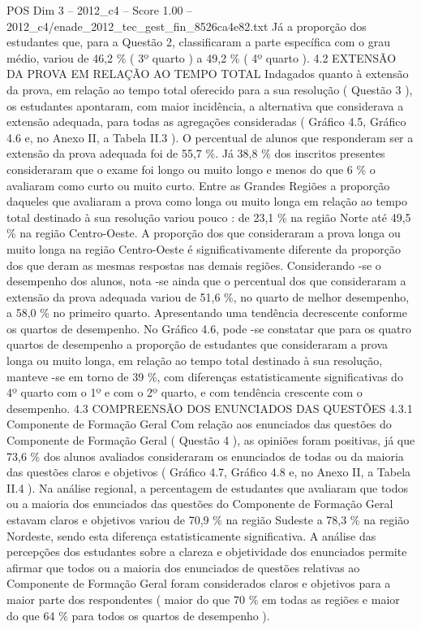 \begin{textsample}{POS Dim 3 – 2012\_c4 – Score 1.00 – 2012\_c4/enade\_2012\_tec\_gest\_fin\_8526ca4e82.txt}
Já a proporção dos estudantes que, para a Questão 2, classificaram a parte específica com o grau médio, variou de 46,2 \% ( 3º quarto ) a 49,2 \% ( 4º quarto ). 4.2 EXTENSÃO DA PROVA EM RELAÇÃO AO TEMPO TOTAL Indagados quanto à extensão da prova, em relação ao tempo total oferecido para a sua resolução ( Questão 3 ), os estudantes apontaram, com maior incidência, a alternativa que considerava a extensão adequada, para todas as agregações consideradas ( Gráfico 4.5, Gráfico 4.6 e, no Anexo II, a Tabela II.3 ).
O percentual de alunos que responderam ser a extensão da prova adequada foi de 55,7 \%.
Já 38,8 \% dos inscritos presentes consideraram que o exame foi longo ou muito longo e menos do que 6 \% o avaliaram como curto ou muito curto.
Entre as Grandes Regiões a proporção daqueles que avaliaram a prova como longa ou muito longa em relação ao tempo total destinado à sua resolução variou pouco : de 23,1 \% na região Norte até 49,5 \% na região Centro-Oeste.
A proporção dos que consideraram a prova longa ou muito longa na região Centro-Oeste é significativamente diferente da proporção dos que deram as mesmas respostas nas demais regiões.
Considerando -se o desempenho dos alunos, nota -se ainda que o percentual dos que consideraram a extensão da prova adequada variou de 51,6 \%, no quarto de melhor desempenho, a 58,0 \% no primeiro quarto.
Apresentando uma tendência decrescente conforme os quartos de desempenho.
No Gráfico 4.6, pode -se constatar que para os quatro quartos de desempenho a proporção de estudantes que consideraram a prova longa ou muito longa, em relação ao tempo total destinado à sua resolução, manteve -se em torno de 39 \%, com diferenças estatisticamente significativas do 4º quarto com o 1º e com o 2º quarto, e com tendência crescente com o desempenho. 4.3 COMPREENSÃO DOS ENUNCIADOS DAS QUESTÕES 4.3.1 Componente de Formação Geral Com relação aos enunciados das questões do Componente de Formação Geral ( Questão 4 ), as opiniões foram positivas, já que 73,6 \% dos alunos avaliados consideraram os enunciados de todas ou da maioria das questões claros e objetivos ( Gráfico 4.7, Gráfico 4.8 e, no Anexo II, a Tabela II.4 ).
Na análise regional, a percentagem de estudantes que avaliaram que todos ou a maioria dos enunciados das questões do Componente de Formação Geral estavam claros e objetivos variou de 70,9 \% na região Sudeste a 78,3 \% na região Nordeste, sendo esta diferença estatisticamente significativa.
A análise das percepções dos estudantes sobre a clareza e objetividade dos enunciados permite afirmar que todos ou a maioria dos enunciados de questões relativas ao Componente de Formação Geral foram considerados claros e objetivos para a maior parte dos respondentes ( maior do que 70 \% em todas as regiões e maior do que 64 \% para todos os quartos de desempenho ).

\end{textsample}

